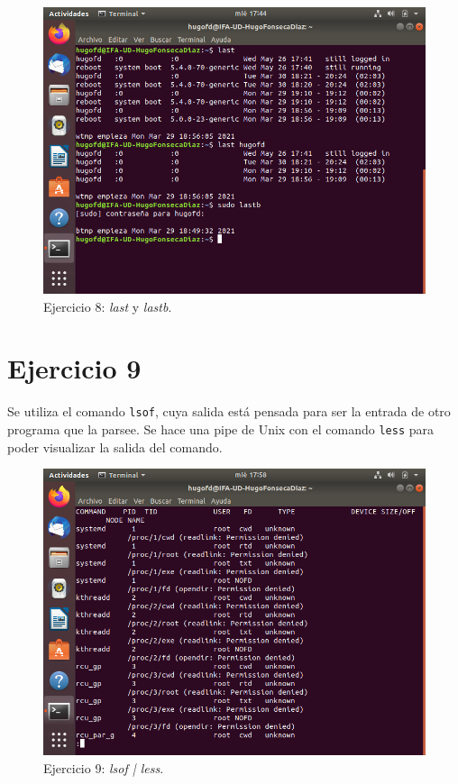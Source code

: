 \documentclass[11pt]{article}
\begin{document}
\begin{figure}[H]
    \caption{Ejercicio 8: \textit{last} y \textit{lastb}.}
  \centering
  \includegraphics{e8.png}
\end{figure}

\section{Ejercicio 9}
Se utiliza el comando \verb|lsof|, cuya salida está pensada para ser la entrada de otro programa que la parsee. Se hace una pipe de Unix con el comando \verb|less| para poder visualizar la salida del comando.

\begin{figure}[H]
    \caption{Ejercicio 9: \textit{lsof | less}.}
  \centering
  \includegraphics{e9.png}
\end{figure}
\end{document}
